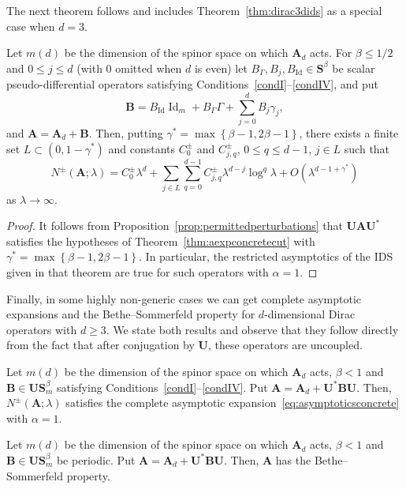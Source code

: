 \documentclass[AHL,Unicode,longabstracts,published]{cedram}
\DeclareMathOperator{\Id}{Id}
\newcommand{\BA}{\mathbf A}
\newcommand{\BB}{\mathbf B}
\newcommand{\BS}{\mathbf S}
\newcommand{\BU}{\mathbf U}
\newcommand{\bigo}[1]{O\left(#1 \right)}
\newcommand{\set}[1]{\left\{ #1 \right\}}
\begin{document}
The next theorem follows and includes Theorem~\ref{thm:dirac3dids} as a special case when $d = 3$.
\begin{theo}
Let $m(d)$ be the dimension of the spinor space on which $\BA_d$ acts. For $\beta \le 1/2$ and $0 \le j \le d$ (with $0$ omitted when $d$ is even) let $B_\Gamma, B_j, B_{\Id} \in \BS^\beta$ be scalar pseudo-differential operators satisfying Conditions~\ref{condI}--\ref{condIV}, and put
\begin{equation}
\BB = B_{\Id} \Id_m + B_\Gamma \Gamma + \sum_{j=0}^d B_j \gamma_j,
\end{equation}
and $\BA = \BA_d + \BB$. Then, putting $\gamma^* = \max \set{\beta - 1, 2
\beta - 1}$, there exists a finite set $L \subset (0, 1 - \gamma^*)$ and constants $C_0^\pm$ and $C_{j,q}^\pm$, $0 \le q \le d-1$, $j \in L$ such that
\begin{equation}
N^\pm(\BA;\lambda) = C_0^\pm \lambda^d + \sum_{j \in L} \sum_{q = 0}^{d-1} C_{j,q}^\pm \lambda^{d-j} \log^q \lambda + \bigo{\lambda^{d-1 + \gamma^*}}
\end{equation}
as $\lambda \to \infty$.
\end{theo}

\begin{proof}
It follows from Proposition~\ref{prop:permittedperturbations} that $\BU \BA \BU^*$ satisfies the hypotheses of Theorem~\ref{thm:aexpconcretecut} with $\gamma^* =
\max\set{\beta - 1, 2 \beta - 1}$. In particular, the restricted asymptotics of the IDS given in that theorem are true for such operators with $\alpha = 1$.
\end{proof}

Finally, in some highly non-generic cases we can get complete asymptotic expansions and the Bethe--Sommerfeld property for $d$-dimensional Dirac operators with $d \ge 3$. We state both results and observe that they follow directly from the fact that after conjugation by $\BU$, these operators are uncoupled.

\begin{theo}
Let $m(d)$ be the dimension of the spinor space on which $\BA_d$ acts, $\beta < 1$ and $\BB \in \BU\BS_m^\beta$ satisfying Conditions~\ref{condI}--\ref{condIV}. Put $\BA = \BA_d + \BU^* \BB \BU$. Then, $N^\pm(\BA;\lambda)$ satisfies the complete asymptotic expansion~\eqref{eq:asymptoticsconcrete} with $\alpha = 1$.
\end{theo}

\begin{theo}
Let $m(d)$ be the dimension of the spinor space on which $\BA_d$ acts, $\beta < 1$ and $\BB \in \BU\BS_m^\beta$ be periodic. Put $\BA = \BA_d + \BU^* \BB
\BU$. Then, $\BA$ has the Bethe--Sommerfeld property.
\end{theo}




\end{document}
